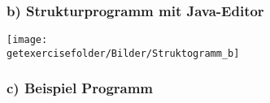 \begin{frame}[fragile]%
\frametitle{b) Strukturprogramm mit Java-Editor}%
\begin{center}

\texttt{[image: \\getexercisefolder/Bilder/Struktogramm\_b]}
\end{center}

\end{frame}


\begin{frame}[fragile]%
 \frametitle{c) Beispiel Programm}%

\end{frame}
